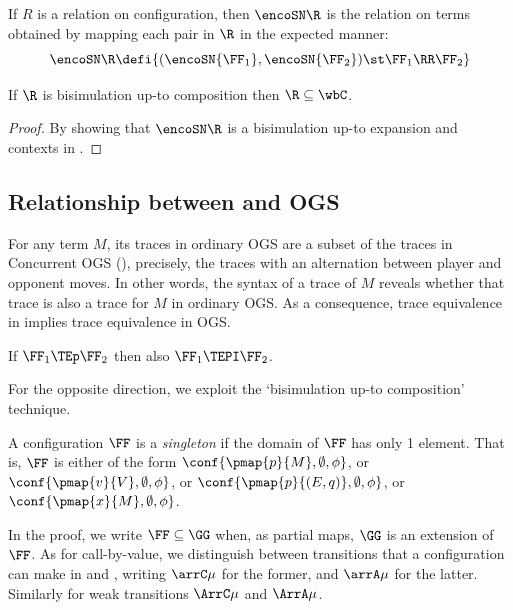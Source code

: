 If $R$ is a relation on configuration, then 
$\encoSN \R$ is the relation on \piI terms obtained by mapping each pair
in $\R$ in the expected manner: 
\[ \encoSN \R \defi \{ (\encoSN {\FF_1}, \encoSN {\FF_2}) \st \FF_1 \RR \FF_2 
 \} \] 


\begin{theorem}
\label{t:uptoComp-cbn}
If 
$\R$ is bisimulation up-to
  composition then $\R \subseteq {\wbC}$.
\end{theorem} 

\begin{proof}
By showing that 
$\encoSN \R$ is a bisimulation up-to expansion and contexts in 
\piI.
\end{proof} 


\subsection{Relationship between \COGS and OGS}


For any term $M$, its traces in ordinary OGS are a subset of the traces in 
Concurrent OGS (\COGS), precisely, the traces with an alternation between player and
opponent moves. 
In other words, the  syntax of a trace of $M$   reveals whether that trace is also a trace
for $M$ in ordinary OGS.  
As a consequence, trace equivalence in \COGS implies trace equivalence in OGS. 

\begin{lemma}
\label{l:CBNPOGS_OGS}
If $\FF_1 \TEp \FF_2  $ then also $\FF_1 \TEPI \FF_2$. 
\end{lemma}


For the opposite direction, we exploit the 
`bisimulation up-to
  composition' technique. 


A configuration $\FF$ is a \emph{singleton} if the domain of $\FF$ has only 1 element. 
That is, $\FF$ is either of the form 
$\conf{\pmap{p}{M}, \emptyset, \phi }$, or 
$\conf{\pmap{v}{V}, \emptyset, \phi }$, or 
$\conf{\pmap{p}{(E,q)}, \emptyset, \phi}$, or
$\conf{\pmap{x}{M}, \emptyset, \phi}$.



In the proof, 
we write $\FF \subseteq \GG$ when, as partial maps, $\GG$ is an extension of $\FF$. 
As for call-by-value, we distinguish between transitions that a configuration can make in \COGS and \AOGS, 
writing $\arrC \mu  $ for the former, and $\arrA\mu$ for the latter. 
Similarly for weak transitions $\ArrC \mu  $ and $\ArrA \mu  $.


